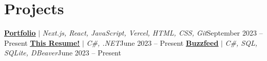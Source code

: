 \section{Projects}
\resumeSubHeadingListStart
\resumeProjectHeading
{\textbf{\href{https://jaychen.app}{\underline{Portfolio}}} $|$ \emph{Next.js, React, JavaScript, Vercel, HTML, CSS, Git}}{September 2023 -- Present}
\resumeItemListStart
{}
\resumeItemListEnd
\resumeProjectHeading
{\textbf{\href{https://github.com/jundachen10/jays_resume}{\underline{This Resume!}}} $|$ \emph{C\#, .NET}}{June 2023 -- Present}
\resumeItemListStart
{}
\resumeItemListEnd
\resumeProjectHeading
{\textbf{\href{https://github.com/jundachen10/buzzfeed}{\underline{Buzzfeed}}} $|$ \emph{C\#, SQL, SQLite, DBeaver}}{June 2023 -- Present}
\resumeItemListStart
{}
\resumeItemListEnd
\resumeSubHeadingListEnd